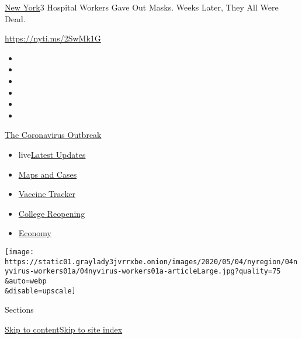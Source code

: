 \href{/section/nyregion}{New York}\textbar{}3 Hospital Workers Gave Out
Masks. Weeks Later, They All Were Dead.

\url{https://nyti.ms/2SwMk1G}

\begin{itemize}
\item
\item
\item
\item
\item
\item
\end{itemize}

\href{https://www.nytimes3xbfgragh.onion/news-event/coronavirus?action=click\&pgtype=Article\&state=default\&region=TOP_BANNER\&context=storylines_menu}{The
Coronavirus Outbreak}

\begin{itemize}
\tightlist
\item
  live\href{https://www.nytimes3xbfgragh.onion/2020/08/04/world/coronavirus-cases.html?action=click\&pgtype=Article\&state=default\&region=TOP_BANNER\&context=storylines_menu}{Latest
  Updates}
\item
  \href{https://www.nytimes3xbfgragh.onion/interactive/2020/us/coronavirus-us-cases.html?action=click\&pgtype=Article\&state=default\&region=TOP_BANNER\&context=storylines_menu}{Maps
  and Cases}
\item
  \href{https://www.nytimes3xbfgragh.onion/interactive/2020/science/coronavirus-vaccine-tracker.html?action=click\&pgtype=Article\&state=default\&region=TOP_BANNER\&context=storylines_menu}{Vaccine
  Tracker}
\item
  \href{https://www.nytimes3xbfgragh.onion/2020/08/02/us/covid-college-reopening.html?action=click\&pgtype=Article\&state=default\&region=TOP_BANNER\&context=storylines_menu}{College
  Reopening}
\item
  \href{https://www.nytimes3xbfgragh.onion/live/2020/08/04/business/stock-market-today-coronavirus?action=click\&pgtype=Article\&state=default\&region=TOP_BANNER\&context=storylines_menu}{Economy}
\end{itemize}

\texttt{[image: https://static01.graylady3jvrrxbe.onion/images/2020/05/04/nyregion/04nyvirus-workers01a/04nyvirus-workers01a-articleLarge.jpg?quality=75\\\&auto=webp\\\&disable=upscale]}

Sections

\protect\hyperlink{site-content}{Skip to
content}\protect\hyperlink{site-index}{Skip to site index}

